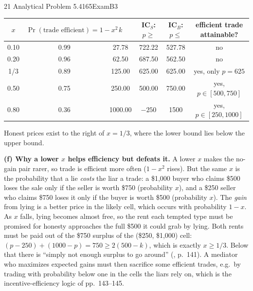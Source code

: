 \begin{exsol}{21}{\MR{} Analytical Problem 5.4}{165}{Exam}{B3}
\begin{center}\small
\begin{tabular}{cccccc}
\toprule
$x$ & $\Pr(\text{trade efficient}) = 1-x^2$ & $k$ & IC$_S$: $p \ge$ & IC$_B$: $p \le$ & efficient trade attainable? \\
\midrule
0.10 & 0.99 & 27.78 & 722.22 & 527.78 & no \\
0.20 & 0.96 & 62.50 & 687.50 & 562.50 & no \\
1/3  & 0.89 & 125.00 & 625.00 & 625.00 & yes, only $p = 625$ \\
0.50 & 0.75 & 250.00 & 500.00 & 750.00 & yes, $p \in [500, 750]$ \\
0.80 & 0.36 & 1000.00 & $-250$ & 1500 & yes, $p \in [250, 1000]$ \\
\bottomrule
\end{tabular}
\end{center}

\begin{center}

{\footnotesize Honest prices exist to the right of $x = 1/3$, where the lower bound lies below
the upper bound.}
\end{center}

\textbf{(f) Why a lower $x$ helps efficiency but defeats it.} A lower $x$ makes the
no-gain pair rarer, so trade is efficient more often ($1-x^2$ rises). But the same $x$ is the
probability that a lie \emph{costs} the liar a trade: a \$1{,}000 buyer who claims \$500 loses the
sale only if the seller is worth \$750 (probability $x$), and a \$250 seller who claims \$750
loses it only if the buyer is worth \$500 (probability $x$). The \emph{gain} from lying is a
better price in the likely cell, which occurs with probability $1-x$. As $x$ falls, lying becomes
almost free, so the rent each tempted type must be promised for honesty approaches the
full \$500 it could grab by lying. Both rents must be paid out of the \$750 surplus of the
(\$250, \$1{,}000) cell: $(p-250) + (1000-p) = 750 \ge 2(500 - k)$, which is exactly $x \ge 1/3$.
Below that there is ``simply not enough surplus to go around'' (\MR, p.~141). A mediator who
maximizes expected gains must then sacrifice some efficient trades, e.g.\ by trading with
probability below one in the cells the liars rely on, which is the incentive-efficiency logic of
\MR{} pp.~143--145.


\end{exsol}
